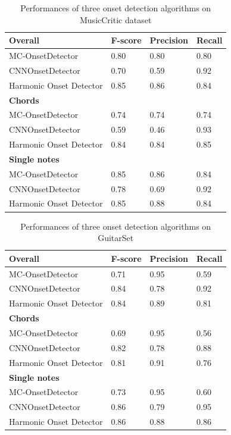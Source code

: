 \begin{table}
 \begin{center}
 \begin{tabular}{|l|l|l|l|}
  \hline
  \textbf{Overall} & F-score & Precision & Recall \\
  \hline
  MC-OnsetDetector & 0.80 & 0.80 & 0.80 \\
  CNNOnsetDetector & 0.70 & 0.59 & 0.92 \\
  Harmonic Onset Detector & 0.85 & 0.86 & 0.84 \\
  \hline
  \hline
  \textbf{Chords} &&& \\
  \hline
  MC-OnsetDetector & 0.74 & 0.74 & 0.74 \\
  CNNOnsetDetector & 0.59 & 0.46 & 0.93 \\
  Harmonic Onset Detector & 0.84 & 0.84 & 0.85 \\
  \hline
  \hline
  \textbf{Single notes} &&& \\
  \hline
  MC-OnsetDetector & 0.85 & 0.86 & 0.84 \\
  CNNOnsetDetector & 0.78 & 0.69 & 0.92 \\
  Harmonic Onset Detector & 0.85 & 0.88 & 0.84 \\
  \hline
 \end{tabular}
\end{center}
 \caption{Performances of three onset detection algorithms on MusicCritic dataset}
 \label{tab:threeMC}
\end{table} 

\begin{table}
 \begin{center}
 \begin{tabular}{|l|l|l|l|}
  \hline
   \textbf{Overall} & F-score & Precision & Recall \\
  \hline
  MC-OnsetDetector & 0.71 & 0.95 & 0.59 \\
  CNNOnsetDetector & 0.84 & 0.78 & 0.92 \\
  Harmonic Onset Detector & 0.84 & 0.89 & 0.81 \\
  \hline
  \hline
  \textbf{Chords} &&& \\
  \hline
  MC-OnsetDetector & 0.69 & 0.95 & 0.56 \\
  CNNOnsetDetector & 0.82 & 0.78 & 0.88 \\
  Harmonic Onset Detector & 0.81 & 0.91 & 0.76 \\
  \hline
  \hline
  \textbf{Single notes} &&& \\
  \hline
  MC-OnsetDetector & 0.73 & 0.95 & 0.60 \\
  CNNOnsetDetector & 0.86 & 0.79 & 0.95 \\
  Harmonic Onset Detector & 0.86 & 0.88 & 0.86 \\
  \hline
 \end{tabular}
\end{center}
 \caption{Performances of three onset detection algorithms on GuitarSet}
 \label{tab:threeGS}
\end{table} 

